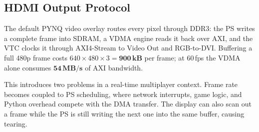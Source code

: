 \subsection{HDMI Output Protocol}




The default PYNQ video overlay routes every pixel through DDR3: the PS
writes a complete frame into SDRAM, a VDMA engine reads it back over AXI,
and the VTC clocks it through AXI4-Stream to Video Out and RGB-to-DVI.
Buffering a full 480p frame costs $640 \times 480 \times 3 =
\mathbf{900\,\text{kB}}$ per frame; at 60\,fps the VDMA alone consumes
$\mathbf{54\,\text{MB/s}}$ of AXI bandwidth.

This introduces two problems in a real-time multiplayer context. Frame
rate becomes coupled to PS scheduling, where network interrupts, game
logic, and Python overhead compete with the DMA transfer. The display can
also scan out a frame while the PS is still writing the next one into the
same buffer, causing tearing.

